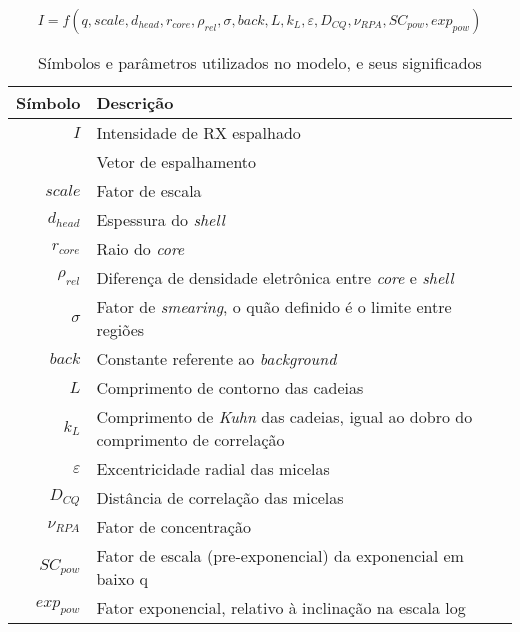 \begin{apendicesenv}
	\begin{equation}
	I = f(q, scale, d_{head}, r_{core}, \rho_{rel}, \sigma, back, L, k_L, \varepsilon, D_{CQ}, \nu_{RPA}, SC_{pow}, exp_{pow})
	\label{eqn:saxs_MG_superficial}
	\end{equation}
    \begin{table}
        \IBGEtab%
        {\caption{Símbolos e parâmetros utilizados no modelo, e seus significados}
         \label{tab_ap:simbolos} }%
        {\begin{tabular}{r p{8cm}}
     	\toprule
         Símbolo 			& Descrição        						\\
         \midrule
         $I$					& Intensidade de RX espalhado			\\
         \q					& Vetor de espalhamento					\\
         \midrule
         $scale$				& Fator de escala						\\
         $d_{head}$			& Espessura do \emph{shell}				\\
         $r_{core}$			& Raio do \emph{core}					\\
         $\rho_{rel}$		& Diferença de densidade eletrônica entre \emph{core} e \emph{shell} \\
         $\sigma$			& Fator de \emph{smearing}, o quão definido é o limite entre regiões \\
         $back$				& Constante referente ao \emph{background} \\
         $L$					& Comprimento de contorno das cadeias 	\\
         $k_L$				& Comprimento de \emph{Kuhn} das cadeias, igual ao dobro do comprimento de correlação \\ %
         $\varepsilon$			& Excentricidade radial das micelas		\\
         $D_{CQ}$			& Distância de correlação das micelas 	\\
         $\nu_{RPA}$			& Fator de concentração					\\
         \midrule
         $SC_{pow}$			& Fator de escala (pre-exponencial) da exponencial em baixo q\\
         $exp_{pow}$			& Fator exponencial, relativo à inclinação na escala log\\
         \bottomrule
        \end{tabular}}%
        {}%
    \end{table}
	

\end{apendicesenv}
